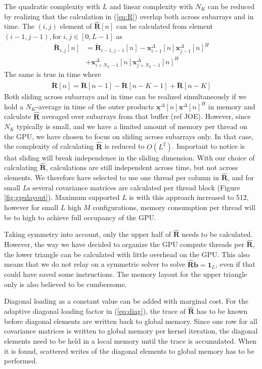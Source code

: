 \documentclass[journal]{IEEEtran}
\newcommand{\mat}[1]{\mathbf{#1}}
\renewcommand{\vec}[1]{\mathbf{#1}}
\begin{document}
The quadratic complexity with $L$ and linear complexity with $N_K$ can be reduced by realizing that the calculation in (\ref{eq:R}) overlap both across subarrays and in time. The $(i,j)$ element of $\mat{\hat{R}}[n]$ can be calculated from element $(i-1, j-1), \text{for } i,j \in [0, L-1]$  as
\begin{align}
\mat{\breve{R}}_{i,j}[n] &=  \mat{\breve{R}}_{i-1,j-1}[n] - \vec{x}_{i-1}^{\Delta}[n]\vec{x}_{j-1}^{\Delta}[n]^H \nonumber \\
&+ \vec{x}_{i+N_L-1}^{\Delta}[n]\vec{x}_{j+N_L-1}^{\Delta}[n]^H
\end{align}
The same is true in time where
\begin{align}
\mat{\breve{R}}[n] = \mat{\breve{R}}[n-1] - \mat{\breve{R}}[n-K-1] + \mat{\breve{R}}[n-K]
\end{align}
Both sliding across subarrays and in time can be realized simultaneously if we hold a $N_K$-average in time of the outer products $\vec{x}^{\Delta}[n]\vec{x}^{\Delta}[n]^H$ in memory and calculate $\mat{\hat{R}}$ averaged over subarrays from that buffer (ref JOE). However, since $N_K$ typically is small, and we have a limited amount of memory per thread on the GPU, we have chosen to focus on sliding across subarrays only. In that case, the complexity of calculating $\mat{\hat{R}}$ is reduced to $O(L^2)$. Important to notice is that sliding will break independence in the sliding dimension. With our choice of calculating $\mat{\hat{R}}$, calculations are still independent across time, but not across elements. We therefore have selected to use one thread per column in $\mat{\hat{R}}$, and for small $L$s several covariance matrices are calculated per thread block (Figure \ref{fig:gpulayout}). Maximum supported $L$ is with this approach increased to 512, however for small $L$ high $M$ configurations, memory consumption per thread will be to high to achieve full occupancy of the GPU.

Taking symmetry into account, only the upper half of $\mat{\hat{R}}$ needs to be calculated. However, the way we have decided to organize the GPU compute threads per $\mat{\hat{R}}$, the lower triangle can be calculated with little overhead on the GPU. This also means that we do not relay on a symmetric solver to solve $\mat{\hat{R}}\vec{b} = \vec{1}_L$, even if that could have saved some instructions. The memory layout for the upper triangle only is also believed to be cumbersome. 

Diagonal loading as a constant value can be added with marginal cost. For the adaptive diagonal loading factor in (\ref{eq:diag}), the trace of $\mat{\hat{R}}$ has to be known before diagonal elements are written back to global memory. Since one row for all covariance matrices is written to global memory per kernel iteration, the diagonal elements need to be held in a local memory until the trace is accumulated. When it is found, scattered writes of the diagonal elements to global memory has to be performed. 
\end{document}
